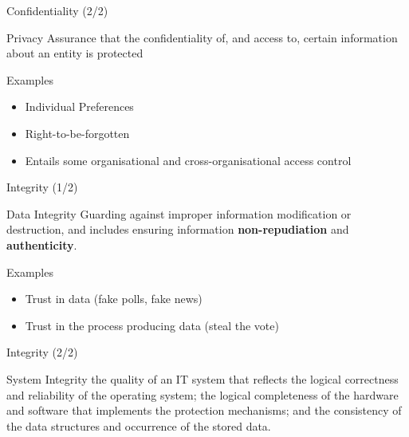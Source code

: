 \begin{reveals}
\begin{frame}[c]{Confidentiality (2/2)}
  
  \begin{block}{Privacy}
    Assurance that the confidentiality of, and access to, certain
    information about an entity is protected
  \end{block}

  \vfill

  \begin{block}{Examples}
    \begin{itemize}
    \item Individual Preferences
    \item Right-to-be-forgotten
    \item Entails some organisational and cross-organisational access control
    \end{itemize}
  \end{block}
\end{frame}


\begin{frame}[c]{Integrity (1/2)}
  
  \begin{block}{Data Integrity}
    Guarding against improper information modification or destruction,
    and includes ensuring information \textbf{non-repudiation} and
    \textbf{authenticity}.
  \end{block}

  \vfill

  \begin{block}{Examples}
    \begin{itemize}
    \item Trust in data (fake polls, fake news)
    \item Trust in the process producing data (steal the vote)
    \end{itemize}
  \end{block}

\end{frame}

\begin{frame}[c]{Integrity (2/2)}
  
  \begin{block}{System Integrity} 
    the quality of an IT system that reflects the logical correctness
    and reliability of the operating system; the logical completeness
    of the hardware and software that implements the protection
    mechanisms; and the consistency of the data structures and
    occurrence of the stored data.
  \end{block}


\end{frame}
\end{reveals}
